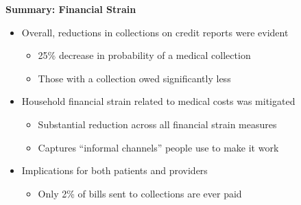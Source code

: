 \documentclass[notes=show]{beamer}
\begin{document}
\begin{frame}[plain]
	\begin{center}
	\textbf{Summary: Financial Strain}
	\end{center}
	
	\begin{itemize}
	\item Overall, reductions in collections on credit reports were evident
		\begin{itemize}
		\item 25\% decrease in probability of a medical collection
		\item Those with a collection owed significantly less
		\end{itemize}
	\item Household financial strain related to medical costs was mitigated
		\begin{itemize}
		\item Substantial reduction across all financial strain measures
		\item Captures ``informal channels'' people use to make it work
		\end{itemize}
	\item Implications for both patients and providers
		\begin{itemize}
		\item Only 2\% of bills sent to collections are ever paid
		\end{itemize}
	\end{itemize}
\end{frame}
\end{document}
